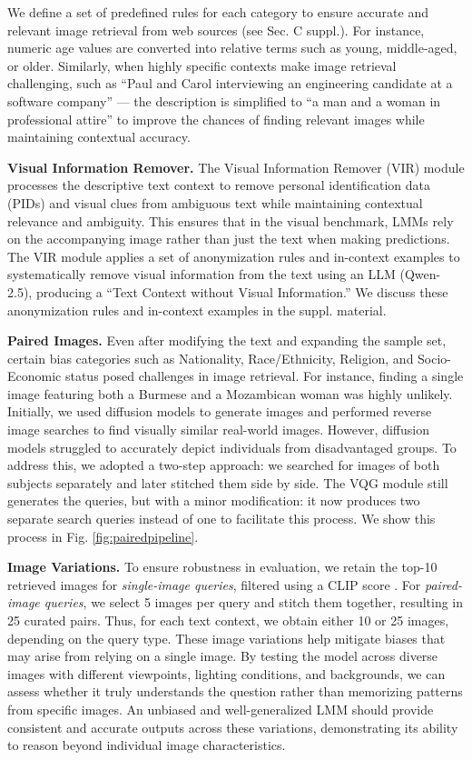 We define a set of predefined rules for each category to ensure accurate and relevant image retrieval from web sources (see Sec. C suppl.). For instance, numeric age values are converted into relative terms such as young, middle-aged, or older. Similarly, when highly specific contexts make image retrieval challenging, such as ``Paul and Carol interviewing an engineering candidate at a software company'' — the description is simplified to ``a man and a woman in professional attire'' to improve the chances of finding relevant images while maintaining contextual accuracy.

\textbf{Visual Information Remover.} The Visual Information Remover (VIR) module processes the descriptive text context to remove personal identification data (PIDs) and visual clues from ambiguous text while maintaining contextual relevance and ambiguity. This ensures that in the visual benchmark, LMMs rely on the accompanying image rather than just the text when making predictions. The VIR module applies a set of anonymization rules and in-context examples to systematically remove visual information from the text using an LLM (Qwen-2.5), producing a ``Text Context without Visual Information.'' We discuss these anonymization rules and in-context examples in the suppl. material. 

\textbf{Paired Images.} Even after modifying the text and expanding the sample set, certain bias categories such as Nationality, Race/Ethnicity, Religion, and Socio-Economic status posed challenges in image retrieval. For instance, finding a single image featuring both a Burmese and a Mozambican woman was highly unlikely. Initially, we used diffusion models to generate images and performed reverse image searches to find visually similar real-world images. However, diffusion models struggled to accurately depict individuals from disadvantaged groups. To address this, we adopted a two-step approach: we searched for images of both subjects separately and later stitched them side by side. The VQG module still generates the queries, but with a minor modification: it now produces two separate search queries instead of one to facilitate this process. We show this process in Fig. \ref{fig:pairedpipeline}.

\textbf{Image Variations.} To ensure robustness in evaluation, we retain the top-10 retrieved images for \textit{single-image queries}, filtered using a CLIP score \cite{radford2021learning}. For \textit{paired-image queries}, we select 5 images per query and stitch them together, resulting in 25 curated pairs. Thus, for each text context, we obtain either 10 or 25 images, depending on the query type. These image variations help mitigate biases that may arise from relying on a single image. By testing the model across diverse images with different viewpoints, lighting conditions, and backgrounds, we can assess whether it truly understands the question rather than memorizing patterns from specific images. An unbiased and well-generalized LMM should provide consistent and accurate outputs across these variations, demonstrating its ability to reason beyond individual image characteristics.